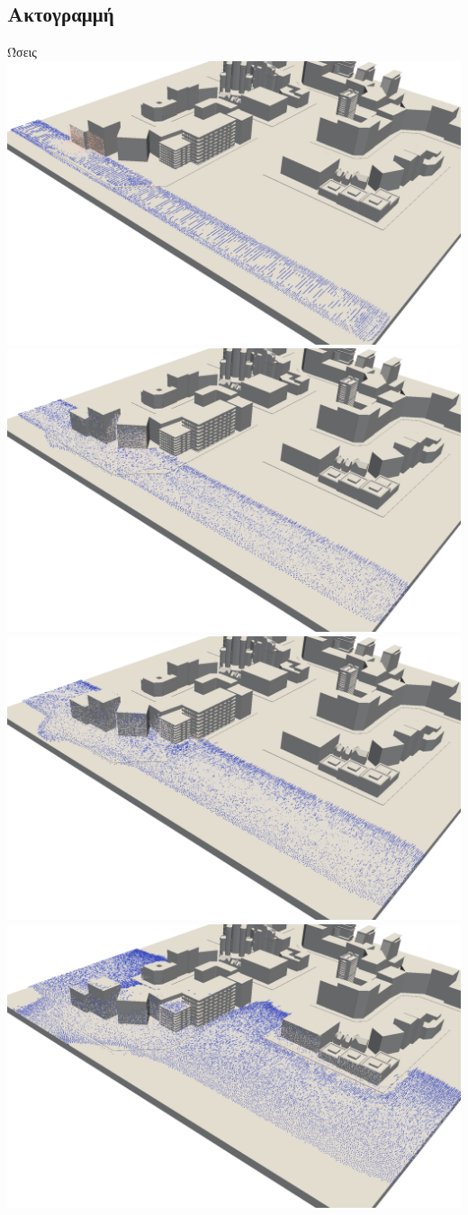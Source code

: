 \documentclass[8pt,sans,mathserif,aspectratio=43]{beamer}
\begin{document}

\subsection{Ακτογραμμή}

\begin{frame}{Ώσεις}
  \includegraphics[width=.5\textwidth]{figures/impulses-0.png}
  \includegraphics[width=.5\textwidth]{figures/impulses-1.png}\\
  \includegraphics[width=.5\textwidth]{figures/impulses-2.png}
  \includegraphics[width=.5\textwidth]{figures/impulses-3.png}
\end{frame}

\end{document}

